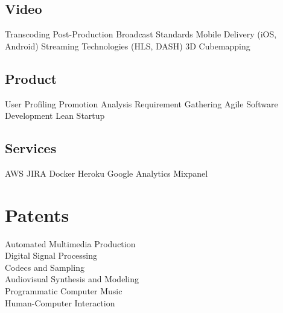 \documentclass[letterpaper]{deedy-resume} %
\begin{document}
\begin{minipage}[t]{0.33\textwidth}
\sectionspace %
 
\subsection{Video}


Transcoding \textbullet{} Post-Production \textbullet{} Broadcast Standards \textbullet{} Mobile Delivery (iOS, Android) \textbullet{} Streaming Technologies (HLS, DASH) \textbullet{}
 3D Cubemapping

\sectionspace %
 
\subsection{Product}

User Profiling \textbullet{} Promotion Analysis \textbullet{} Requirement Gathering \textbullet{} Agile Software Development \textbullet{} Lean Startup

\sectionspace %
 
\subsection{Services}

AWS \textbullet{} JIRA \textbullet{} Docker \textbullet{} Heroku \textbullet{} Google Analytics \textbullet{} Mixpanel 


\sectionspace %


\section{Patents}

Automated Multimedia Production \\
Digital Signal Processing \\
Codecs and Sampling \\
Audiovisual Synthesis and Modeling \\
Programmatic Computer Music \\
Human-Computer Interaction


\end{minipage}
\end{document}
